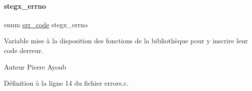 \paragraph{\texorpdfstring{stegx\+\_\+errno}{stegx\_errno}}
{\footnotesize\ttfamily enum \hyperlink{a00011_a08b18ac8af0f3462354240d9732f3852}{err\+\_\+code} stegx\+\_\+errno}

Variable mise à la disposition des fonctions de la bibliothèque pour y inscrire leur code d\textquotesingle{}erreur. \begin{DoxyAuthor}{Auteur}
Pierre Ayoub 
\end{DoxyAuthor}


Définition à la ligne 14 du fichier errors.\+c.

